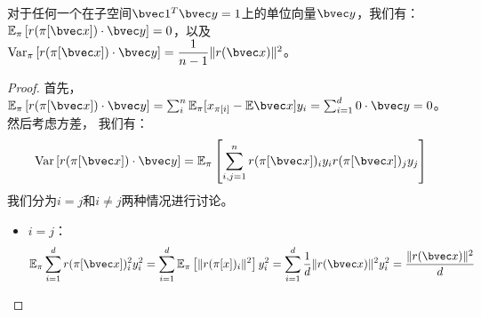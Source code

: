 \begin{theorem}
\label{thm:ss-perm:perm-dist}
    对于任何一个在子空间$\bvec 1^T \bvec y = 1$上的单位向量$\bvec y$，我们有：
    $\mathbb E_\pi \left[r(\pi[\bvec x])  \cdot \bvec y\right] = 0$，以及$\textnormal{Var}_\pi \left[ r(\pi[\bvec x])\cdot \bvec y \right] = \dfrac{1}{n - 1} \Vert r(\bvec x) \Vert^2$。
\end{theorem}
%
\begin{proof}
首先，$\mathbb E_\pi  \left[r(\pi[\bvec x]) \cdot \bvec y\right] = \sum_{i}^n \mathbb E_\pi [x_{\pi[i]} - \mathbb E\bvec x] y_i = \sum_{i=1}^d 0 \cdot \bvec y = 0$。然后考虑方差，
我们有：
\begin{equation}
\begin{split}
    \text{Var}\left[ r(\pi[\bvec x])\cdot \bvec y \right] = \mathbb E_\pi \left[\sum_{i,j=1}^n  r(\pi[\bvec x])_i y_i r(\pi[\bvec x])_j y_j \right]
\end{split}
\end{equation}
我们分为$i = j$和$i \ne j$两种情况进行讨论。
\begin{itemize}
    \item $i = j$：
    \begin{equation}
        \mathbb E_\pi \sum_{i = 1}^d r(\pi[\bvec x])_i^2 y_i^2 = \sum_{i=1}^d \mathbb E_\pi \left[ \Vert r(\pi[x])_i\Vert^2 \right] y_i^2 = \sum_{i=1}^d \dfrac{1}{d} \Vert r(\bvec x) \Vert^2 y_i^2 = \dfrac{\Vert r(\bvec x)\Vert^2}d
    \end{equation}
    

\end{itemize}
\end{proof}
